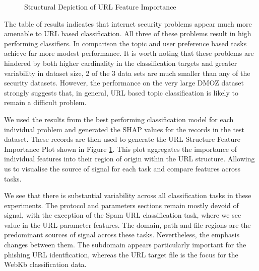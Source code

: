 \documentclass{aircc}
\begin{document}
\begin{figure}
\centering
{}
\caption{Structural Depiction of URL Feature Importance}
\label{fig:importance}
\end{figure}

The table of results indicates that internet security problems appear much more amenable to URL based 
classification. All three of these problems result in high performing classifiers. In comparison the topic
and user preference based tasks achieve far more modest performance. It is worth noting that these problems 
are hindered by both higher cardinality in the classification targets and greater variability in dataset size,
 2 of the 3 data sets are much smaller than any of the security datasets. However, the performance on the very large DMOZ
dataset strongly suggests that, in general, URL based topic classification is likely to remain a difficult
problem. 

We used the results from the best performing classification model for each individual problem and generated
the SHAP values for the records in the test dataset. These records are then used to generate the URL Structure 
Feature Importance Plot shown in Figure \ref{fig:importance}. This plot aggregates the importance of individual
features into their region of origin within the URL structure. Allowing us to visualise the source of signal for
each task and compare features across tasks.

We see that there is substantial variability across all classification tasks in these experiments.
The protocol and parameters sections remain mostly devoid of signal, with the exception of the Spam URL classification
task, where we see value in the URL parameter features. The domain, path and file regions are the predominant sources
of signal across these tasks. Nevertheless, the emphasis changes between them. The subdomain appears particularly
important for the phishing URL identfication, whereas the URL target file is the focus for the WebKb classification data.
\end{document}
